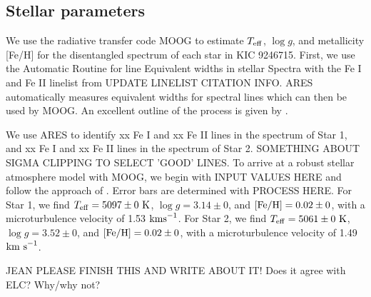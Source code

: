 \subsection{Stellar parameters}\label{parameters}
We use the radiative transfer code MOOG \citep{sne73} to estimate $T_{\rm{eff}}$, $\log g$, and metallicity [Fe/H] for the disentangled spectrum of each star in KIC 9246715. First, we use the Automatic Routine for line Equivalent widths in stellar Spectra \citep[ARES,][]{Sousa_2007} with the Fe I and Fe II linelist from \citet{Yong_2005} UPDATE LINELIST CITATION INFO. ARES automatically measures equivalent widths for spectral lines which can then be used by MOOG. An excellent outline of the process is given by \citet{Sousa_2014}.

We use ARES to identify xx Fe I and xx Fe II lines in the spectrum of Star 1, and xx Fe I and xx Fe II lines in the spectrum of Star 2. SOMETHING ABOUT SIGMA CLIPPING TO SELECT 'GOOD' LINES. To arrive at a robust stellar atmosphere model with MOOG, we begin with INPUT VALUES HERE and follow the approach of \citet{Mag13}. Error bars are determined with PROCESS HERE. For Star 1, we find $T_{\rm{eff}} = 5097 \pm 0 \ \rm{K}$, $\log g = 3.14 \pm 0$, and $\rm{[Fe/H]} = 0.02 \pm 0$, with a microturbulence velocity of 1.53 $\rm{km s}^{-1}$. For Star 2, we find $T_{\rm{eff}} = 5061 \pm 0 \ \rm{K}$, $\log g = 3.52 \pm 0$, and $\rm{[Fe/H]} = 0.02 \pm 0$, with a microturbulence velocity of 1.49 $\rm{km \ s}^{-1}$.

JEAN PLEASE FINISH THIS AND WRITE ABOUT IT! Does it agree with ELC? Why/why not?
    
    